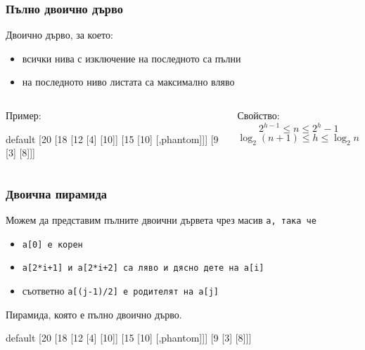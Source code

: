 \documentclass{beamer}
\newcommand{\samplebinheap}{\begin{forest}
    default [20 [18 [12 [4] [10]] [15 [10] [,phantom]]] [9 [3] [8]]]
\end{forest}}
\begin{document}
\begin{frame}
  \frametitle{Пълно двоично дърво}

  \begin{definition}
    Двоично дърво, за което:
    \begin{itemize}
    \item всички нива с изключение на последното са пълни
    \item на последното ниво листата са максимално вляво
    \end{itemize}
  \end{definition}
  \pause
  \begin{columns}[t,onlytextwidth]
    \begin{column}{0.5\textwidth}
      Пример:
      \begin{center}
        \samplebinheap
      \end{center}
    \end{column}
    \begin{column}{0.5\textwidth}
      \pause
      Свойство:
      \begin{equation*}
        2^{h-1} \leq n \leq 2^h-1
      \end{equation*}
      \pause
      \begin{equation*}
        \log_2(n+1) \leq h \leq \log_2 n + 1
      \end{equation*}
    \end{column}
  \end{columns}
\end{frame}

\begin{frame}
  \frametitle{Двоична пирамида}

  Можем да представим пълните двоични дървета чрез масив \tt a, така че
  \begin{itemize}[<+->]
  \item \tt{a[0]} е корен
  \item \tt{a[2*i+1]} и \tt{a[2*i+2]} са ляво и дясно дете на \tt{a[i]}
  \item съответно \tt{a[(j-1)/2]} е родителят на \tt{a[j]}
  \end{itemize}
  \onslide<+->
  \begin{definition}
    Пирамида, която е пълно двоично дърво.
  \end{definition}
  \onslide<+->
  \begin{center}
    \small \samplebinheap
  \end{center}
\end{frame}
\end{document}
